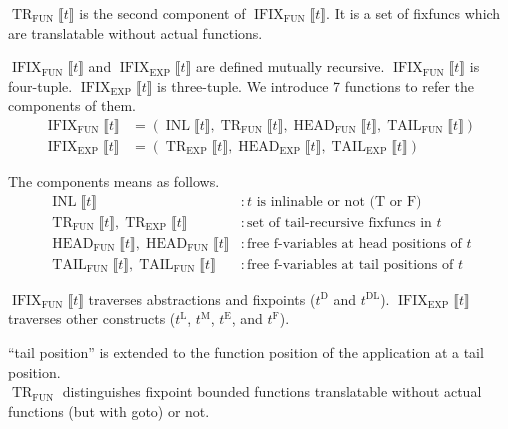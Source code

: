 \documentclass[a4paper,fleqn]{article}
\newcommand{\tDL}{t^\mathrm{DL}}
\newcommand{\tD}{t^\mathrm{D}}
\newcommand{\tE}{t^\mathrm{E}}
\newcommand{\tL}{t^\mathrm{L}}
\newcommand{\tM}{t^\mathrm{M}}
\newcommand{\tF}{t^\mathrm{F}}
\newcommand{\BRA}[1]{\llbracket #1 \rrbracket}
\DeclareMathOperator{\TRop}{TR}
\newcommand{\TRFUN}[1]{\TRop_\text{FUN}\BRA{#1}}
\newcommand{\TREXP}[1]{\TRop_\text{EXP}\BRA{#1}}
\DeclareMathOperator{\INLop}{INL}
\newcommand{\INL}[1]{\INLop\BRA{#1}}
\DeclareMathOperator{\RNTop}{IFIX}
\newcommand{\RNTFUN}[1]{\RNTop_\text{FUN}\BRA{#1}}
\newcommand{\RNTEXP}[1]{\RNTop_\text{EXP}\BRA{#1}}
\DeclareMathOperator{\MyH}{HEAD}
\DeclareMathOperator{\MyT}{TAIL}
\newcommand{\HFUN}[1]{\MyH_\text{FUN}\BRA{#1}}
\newcommand{\HEXP}[1]{\MyH_\text{EXP}\BRA{#1}}
\newcommand{\TFUN}[1]{\MyT_\text{FUN}\BRA{#1}}
\newcommand{\TEXP}[1]{\MyT_\text{EXP}\BRA{#1}}
\newcommand{\true}{\mathrm{T}}
\newcommand{\false}{\mathrm{F}}
\newcommand{\kwgoto}{\mbox{\color{myviolet}\ttfamily goto}}
\begin{document}
$\TRFUN{t}$ is the second component of $\RNTFUN{t}$.
It is a set of fixfuncs which are translatable without actual functions.

$\RNTFUN{t}$ and $\RNTEXP{t}$ are defined mutually recursive.
$\RNTFUN{t}$ is four-tuple.
$\RNTEXP{t}$ is three-tuple.
We introduce 7 functions to refer the components of them.
\begin{align*}
  \RNTFUN{t} &= (\INL{t}, \TRFUN{t}, \HFUN{t}, \TFUN{t}) \\
  \RNTEXP{t} &= (\TREXP{t}, \HEXP{t}, \TEXP{t})
\end{align*}

The components means as follows.
\begin{align*}
  \INL{t} &: \text{$t$ is inlinable or not ($\true$ or $\false$)} \\
  \TRFUN{t}, \TREXP{t} &: \text{set of tail-recursive fixfuncs in $t$} \\
  \HFUN{t}, \HFUN{t} &: \text{free f-variables at head positions of $t$} \\
  \TFUN{t}, \TFUN{t} &: \text{free f-variables at tail positions of $t$}
\end{align*}

$\RNTFUN{t}$ traverses abstractions and fixpoints ($\tD$ and $\tDL$).
$\RNTEXP{t}$ traverses other constructs ($\tL$, $\tM$, $\tE$, and $\tF$).

``tail position'' is extended to the function position of the application at a tail position. \\
$\TRop_\text{FUN}$ distinguishes fixpoint bounded functions translatable without actual functions (but with \kwgoto{}) or not.
\end{document}
